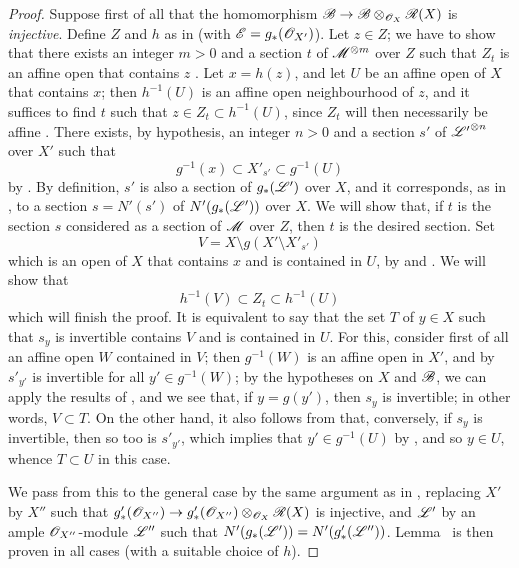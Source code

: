 \begin{proof}
Suppose first of all that the homomorphism $\sh{B}\to\sh{B}\otimes_{\sh{O}_X}\sh{R}(X)$ is \emph{injective}.
Define $Z$ and $h$ as in  (with $\mathscr{E}=g_*(\mathscr{O}_{X'})$).
Let $z\in Z$;
we have to show that there exists an integer $m>0$ and a section $t$ of $\mathscr{M}^{\otimes m}$ over $Z$ such that $Z_t$ is an affine open that contains $z$ .
Let $x=h(z)$, and let $U$ be an affine open of $X$ that contains $x$;
then $h^{-1}(U)$ is an affine open neighbourhood of $z$, and it suffices to find $t$ such that $z\in Z_t\subset h^{-1}(U)$, since $Z_t$ will then necessarily be affine .
There exists, by hypothesis, an integer $n>0$ and a section $s'$ of ${\mathscr{L}'}^{\otimes n}$ over $X'$ such that
\[
\label{II.6.6.9.1}
  g^{-1}(x) \subset X'_{s'} \subset g^{-1}(U)
\tag{6.6.9.1}
\]
by .
By definition, $s'$ is also a section of $g_*(\mathscr{L}')$ over $X$, and it corresponds, as in , to a section $s=N'(s')$ of $N'(g_*(\mathscr{L}'))$ over $X$.
We will show that, if $t$ is the section $s$ considered as a section of $\mathscr{M}$ over $Z$, then $t$ is the desired section.
Set
\[
\label{II.6.6.9.2}
  V = X\setminus g(X'\setminus X'_{s'})
\tag{6.6.9.2}
\]
which is an open of $X$ that contains $x$ and is contained in $U$, by  and .
We will show that
\[
\label{II.6.6.9.3}
  h^{-1}(V) \subset Z_t \subset h^{-1}(U)
\tag{6.6.9.3}
\]
which will finish the proof.
It is equivalent to say that the set $T$ of $y\in X$ such that $s_y$ is invertible contains $V$ and is contained in $U$.
For this, consider first of all an affine open $W$ contained in $V$;
then $g^{-1}(W)$ is an affine open in $X'$, and by  $s'_{y'}$ is invertible for all $y'\in g^{-1}(W)$;
by the hypotheses on $X$ and $\mathscr{B}$, we can apply the results of , and we see that, if $y=g(y')$, then $s_y$ is invertible;
in other words, $V\subset T$.
On the other hand, it also follows from  that, conversely, if $s_y$ is invertible, then so too is $s'_{y'}$, which implies that $y'\in g^{-1}(U)$ by , and so $y\in U$, whence $T\subset U$ in this case.

We pass from this to the general case by the same argument as in , replacing $X'$ by $X''$ such that $g'_*(\sh{O}_{X''})\to g'_*(\sh{O}_{X''})\otimes_{\sh{O}_X}\sh{R}(X)$ is injective, and $\mathscr{L}'$ by an ample $\mathscr{O}_{X''}$-module $\mathscr{L}''$ such that $N'(g_*(\mathscr{L}'))=N'(g'_*(\mathscr{L}''))$.
Lemma~ is then proven in all cases (with a suitable choice of $h$).
\end{proof}

